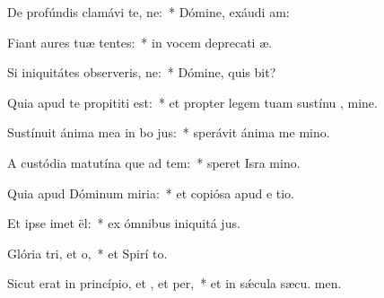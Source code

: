 \item De profúndis clamávi  te, ne:~* Dómine, exáudi  am:
\item Fiant aures tuæ tentes:~* in vocem deprecati æ.
\item Si iniquitátes observeris, ne:~* Dómine, quis bit?
\item Quia apud te propititi est:~* et propter legem tuam sustínu , mine.
\item Sustínuit ánima mea in bo jus:~* sperávit ánima me  mino.
\item A custódia matutína que ad tem:~* speret Isra  mino.
\item Quia apud Dóminum miria:~* et copiósa apud e tio.
\item Et ipse imet ël:~* ex ómnibus iniquitá jus.
\item Glória tri, et o,~* et Spirí to.
\item Sicut erat in princípio, et , et per,~* et in sǽcula sæcu. men.
